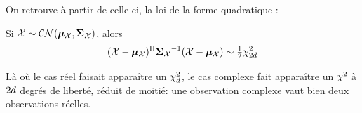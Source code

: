 %
%

On retrouve à partir de celle-ci, la loi de la forme quadratique :

\begin{property}
\label{prop:context-complex-quadform}
  Si $\mathcal{X}\sim\mathcal{CN}(\boldsymbol{\mu}_{\mathcal{X}},\boldsymbol{\Sigma}_{\mathcal{X}})$, alors
  \begin{equation}
    (\mathcal{X}-\boldsymbol{\mu}_{\mathcal{X}})^{\mathrm{H}} {\boldsymbol{\Sigma}_{\mathcal{X}}}^{-1} (\mathcal{X}-\boldsymbol{\mu}_{\mathcal{X}})
    \sim
    \tfrac12\chi^2_{2d}
    \label{eq:context-complex-quadform}
  \end{equation}
\end{property}

\begin{remark}
  Là où le cas réel faisait apparaître un $\chi^2_d$, le cas complexe fait apparaître un $\chi^2$ à $2d$ degrés de liberté, réduit de moitié: une observation complexe vaut bien deux observations réelles.
\end{remark}

